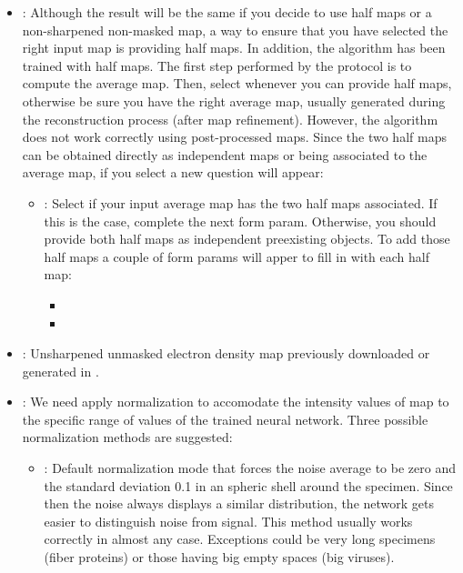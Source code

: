 \begin{itemize}
    \begin{itemize}
        \item {}: Although the result will be the same if you decide to use half maps or a non-sharpened non-masked map, a way to ensure that you have selected the right input map is providing half maps. In addition, the algorithm has been trained with half maps. The first step performed by the protocol is to compute the average map. Then, select  whenever you can provide half maps, otherwise be sure you have the right average map, usually generated during the reconstruction process (after map refinement). However, the algorithm does not work correctly using post-processed maps. Since the two half maps can be obtained directly as independent maps or being associated to the average map, if you select  a new question will appear:
            \begin{itemize}
            \item {}: Select  if your input average map has the two half maps associated. If this is the case, complete the next form param. Otherwise, you should provide both half maps as independent preexisting \scipion objects. To add those half maps a couple of form params will apper to fill in with each half map:
                \begin{itemize}
                \item {}
                \item {}
                \end{itemize}
            \end{itemize}
        \item {}: Unsharpened unmasked electron density map previously downloaded or generated in \scipion.
        \item {}: We need apply normalization to accomodate the intensity values of map to the specific range of values of the trained neural network. Three possible normalization methods are suggested:
        \begin{itemize}
            \item {}: Default normalization mode that forces the noise average to be zero and the standard deviation 0.1 in an spheric shell around the specimen. Since then the noise always displays a similar distribution, the network gets easier to distinguish noise from signal. This method usually works correctly in almost any case. Exceptions could be very long specimens (fiber proteins) or those having big empty spaces (big viruses).

\end{itemize}
\end{itemize}
\end{itemize}
